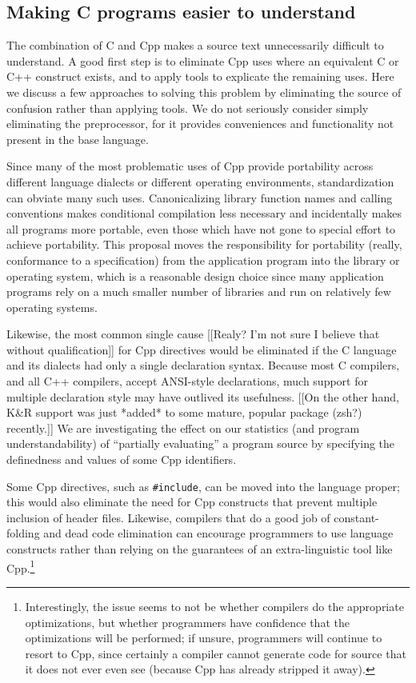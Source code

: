 \documentclass[10pt]{article}
\begin{document}
\subsection{Making C programs easier to understand}

The combination of C and Cpp makes a source text unnecessarily difficult to
understand.  A good first step is to eliminate Cpp uses where an equivalent
C or C++ construct exists, and to apply tools to explicate the remaining
uses.  Here we discuss a few approaches to solving this problem by
eliminating the source of confusion rather than applying tools.  We do not
seriously consider simply eliminating the preprocessor, for it provides
conveniences and functionality not present in the base language.

Since many of the most problematic uses of Cpp provide portability across
different language dialects or different operating environments,
standardization can obviate many such uses.  Canonicalizing library
function names and calling conventions makes conditional compilation less
necessary and incidentally makes all programs more portable, even those
which have not gone to special effort to achieve portability.  This
proposal moves the responsibility for portability (really, conformance to a
specification) from the application program into the library or operating
system, which is a reasonable design choice since many application programs
rely on a much smaller number of libraries and run on relatively few
operating systems.

Likewise, the most common single cause [[Realy?  I'm not sure I believe
that without qualification]] for Cpp directives would be eliminated if the
C language and its dialects had only a single declaration syntax.  Because
most C compilers, and all C++ compilers, accept ANSI-style declarations,
much support for multiple declaration style may have outlived its
usefulness.  [[On the other hand, K\&R support was just *added* to some
mature, popular package (zsh?) recently.]]  We are investigating the effect
on our statistics (and program understandability) of ``partially
evaluating'' a program source by specifying the definedness and values of
some Cpp identifiers.

Some Cpp directives, such as {\tt \#include}, can be moved into the
language proper; this would also eliminate the need for Cpp constructs that
prevent multiple inclusion of header files.  Likewise, compilers that do a
good job of constant-folding and dead code elimination can encourage
programmers to use language constructs rather than relying on the
guarantees of an extra-linguistic tool like Cpp.\footnote{Interestingly,
  the issue seems to not be whether compilers do the appropriate
  optimizations, but whether programmers have confidence that the
  optimizations will be performed; if unsure, programmers will continue to
  resort to Cpp, since certainly a compiler cannot generate code for source
  that it does not ever even see (because Cpp has already stripped it
  away).}
\end{document}
